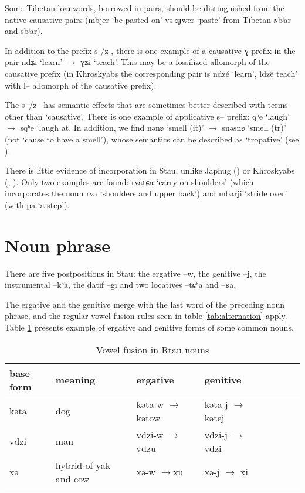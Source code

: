 \documentclass[oneside,a4paper,11pt]{article}
\newcommand{\ipa}[1]{{\phon #1}} %
\begin{document}
Some Tibetan  loanwords, borrowed in pairs, should be distinguished from the native causative pairs (\ipa{mbjer} `be pasted on' vs \ipa{zɟwer}  `paste' from Tibetan \ipa{ɴbʲar} and \ipa{sbʲar}).
 
 
 In addition to the prefix \ipa{s-/z-}, there is one example of a causative \ipa{ɣ} prefix in the pair   \ipa{ndʑi} `learn'    $\rightarrow$  \ipa{ɣʑi} `teach'. This may be a fossilized allomorph of the causative prefix (in Khroskyabs the corresponding pair is \ipa{ndzé} `learn', \ipa{ldzê}  teach' with \ipa{l--} allomorph of the causative prefix).
     
The \ipa{s--/z--} has semantic effects that are sometimes better described with terms other than `causative'. There is one example of applicative \ipa{s--} prefix: \ipa{qʰe}  `laugh' $\rightarrow$ \ipa{sqʰe} `laugh at. In addition, we find \ipa{nənʚ}  `smell (it)' $\rightarrow$ \ipa{snəsnʚ} `smell (tr)' (not `cause to have a smell'), whose semantics can be described as `tropative' (see \citealt{jacques13tropative}).
 
 
 There is little evidence of incorporation in Stau, unlike Japhug (\citealt{jacques12incorp}) or Khroskyabs (\citealt{lai13affixale}, \citealt{lai14person}). Only two examples are found: \ipa{rvatɕa} `carry on shoulders' (which incorporates the noun \ipa{rva} `shoulders and upper back') and \ipa{mbarji} `stride over' (with \ipa{pa}  `a step').

 

 \section{Noun phrase}
 
There are five postpositions in Stau: the ergative \ipa{--w}, the genitive \ipa{--j}, the instrumental \ipa{--kʰa}, the datif \ipa{--gi} and two locatives \ipa{--tɕʰa} and \ipa{--ʁa}.


The ergative and the genitive merge with the last word of the preceding noun phrase, and the regular vowel fusion rules seen in table \ref{tab:alternation} apply. Table \ref{tab:alternation.noun} presents example of ergative and genitive forms of some common nouns.

\begin{table}[H]
\caption{Vowel fusion in Rtau nouns} \label{tab:alternation.noun} \centering
\begin{tabular}{l|lllllll}
\toprule
base form & meaning & ergative & genitive \\
\midrule
\ipa{kəta} & dog & \ipa{kəta-w} $\rightarrow$ \ipa{kətow} & \ipa{kəta-j} $\rightarrow$ \ipa{kətej} & \\
\ipa{vdzi} & man & \ipa{vdzi-w} $\rightarrow$  \ipa{vdzu} & \ipa{vdzi-j} $\rightarrow$ \ipa{vdzi} & \\
\ipa{xə} & hybrid of yak and cow &\ipa{xə-w}  $\rightarrow$\ipa{xu} & \ipa{xə-j} $\rightarrow$ \ipa{xi} & \\
\bottomrule
\end{tabular}
\end{table}
\end{document}

